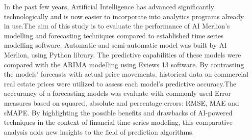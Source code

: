 
\begin{Abstrakt}
    In the past few years, Artificial Intelligence has advanced significantly technologically and is now easier to incorporate into analytics programs already in use.\newline The aim of this study is to evaluate the performance of AI Merlion's modelling and forecasting techniques compared to established time series modelling software. Automatic and  semi-automatic model was built by AI Merlion, using Python library. The predictive capabilities of these models were compared with the ARIMA modelling using Eviews 13 software. By contrasting the models' forecasts with actual price movements, historical data on commercial real estate prices were utilized to assess each model's predictive accuracy.\newline The acccurancy of a forecasting models was evaluate with commonly used Error measures based on squared, absolute and percentage errors: RMSE, MAE and sMAPE. By highlighting the possible benefits and drawbacks of AI-powered techniques in the context of financial time series modeling, this comparative analysis adds new insights to the field of prediction algorithms.
\end{Abstrakt}



\clearpage